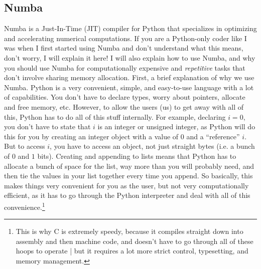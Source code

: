 \documentclass[11pt]{article}
\renewcommand{\_}[1]{\underline{ #1 }}
\newcommand{\npar}{\vspace{.3cm}\newline}
\begin{document}
{\subsection{Numba}\label{numba}

Numba is a Just-In-Time (JIT) compiler for Python that specializes in optimizing and accelerating numerical computations. If you are a Python-only coder like I was when I first started using Numba and don't understand what this means, don't worry, I will explain it here! I will also explain how to use Numba, and why you should use Numba for computationally expensive and \textit{repetitive} tasks that don't involve sharing memory allocation.
\npar
First, a brief explanation of why we use Numba. Python is a very convenient, simple, and easy-to-use language with a lot of capabilities. You don't have to declare types, worry about pointers, allocate and free memory, etc. However, to allow the users (us) to get away with all of this, Python has to do all of this stuff internally. For example, declaring $i = 0$, you don't have to state that $i$ is an integer or unsigned integer, as Python will do this for you by creating an integer object with a value of $0$ and a ``reference'' $i$. But to access $i$, you have to access an object, not just straight bytes (i.e. a bunch of $0$ and $1$ bits). Creating and appending to lists means that Python has to allocate a bunch of space for the list, way more than you will probably need, and then tie the values in your list together every time you append. So basically, this makes things very convenient for you as the user, but not very computationally efficient, as it has to go through the Python interpreter and deal with all of this convenience.\footnote{This is why C is extremely speedy, because it compiles straight down into assembly and then machine code, and doesn't have to go through all of these hoops to operate | but it requires a lot more strict control, typesetting, and memory management.}
\npar
}
\end{document}
